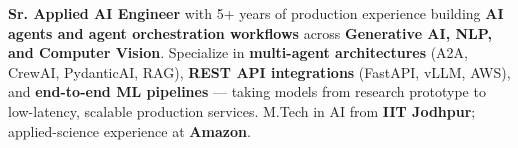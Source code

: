 \documentclass[letter,10pt]{article}
\begin{document}

\textbf{Sr. Applied AI Engineer} with 5+ years of production experience building \textbf{AI agents and agent orchestration workflows} across \textbf{Generative AI, NLP, and Computer Vision}.
Specialize in \textbf{multi-agent architectures} (A2A, CrewAI, PydanticAI, RAG), \textbf{REST API integrations} (FastAPI, vLLM, AWS), and \textbf{end-to-end ML pipelines} — taking models from research prototype to low-latency, scalable production services.
M.Tech in AI from \textbf{IIT Jodhpur}; applied-science experience at \textbf{Amazon}.
\end{document}
